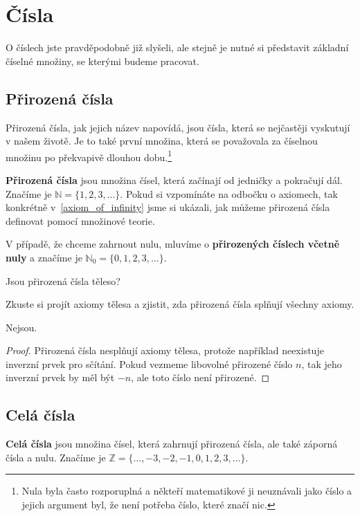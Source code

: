 \section{Čísla}
O číslech jste pravděpodobně již slyšeli, ale stejně je nutné si představit základní číselné množiny, se kterými budeme pracovat. 

\subsection{Přirozená čísla}
Přirozená čísla, jak jejich název napovídá, jsou čísla, která se nejčastěji vyskutují v našem životě. Je to také první množina, která se považovala za číselnou množinu po překvapivě dlouhou dobu.\footnote{Nula byla často rozporuplná a někteří matematikové ji neuznávali jako číslo a jejich argument byl, že není potřeba číslo, které značí nic.} 
\begin{definitionbox}
  \textbf{Přirozená čísla} jsou množina čísel, která začínají od jedničky a pokračují dál. Značíme je $\mathbb{N} = \{1, 2, 3, \ldots\}$. Pokud si vzpomínáte na odbočku o axiomech, tak konkrétně v~\ref{axiom_of_infinity} jsme si ukázali, jak můžeme přirozená čísla definovat pomocí množinové teorie.

  V případě, že chceme zahrnout nulu, mluvíme o \textbf{přirozených číslech včetně nuly} a značíme je $\mathbb{N}_0 = \{0, 1, 2, 3, \ldots\}$.
\end{definitionbox}

\begin{problem}
  Jsou přirozená čísla těleso?
\end{problem}

\begin{hint}
  Zkuste si projít axiomy tělesa a zjistit, zda přirozená čísla splňují všechny axiomy.
\end{hint}

\begin{solution}
  Nejsou.

  \begin{proof}
    Přirozená čísla nesplňují axiomy tělesa, protože například neexistuje inverzní prvek pro sčítání. Pokud vezmeme libovolné přirozené číslo $n$, tak jeho inverzní prvek by měl být $-n$, ale toto číslo není přirozené.
  \end{proof}
\end{solution}

\subsection{Celá čísla}
\begin{definitionbox}
  \textbf{Celá čísla} jsou množina čísel, která zahrnují přirozená čísla, ale také záporná čísla a nulu. Značíme je $\mathbb{Z} = \{\ldots, -3, -2, -1, 0, 1, 2, 3, \ldots\}$.
\end{definitionbox}


